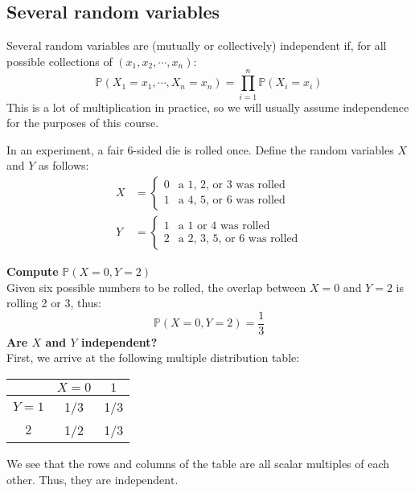 \documentclass[titlepage, 12pt, leqno]{article}
\begin{document}
\subsection{Several random variables}
Several random variables are (mutually or collectively) independent if, for all 
possible collections of $(x_1,x_2, \cdots ,x_n)$:
\[
\mathbb{P}(X_1 = x_1, \cdots , X_n = x_n) = \prod_{i=1}^{n}\mathbb{P}(X_i=x_i)
\]
This is a lot of multiplication in practice, so we will usually assume 
independence for the purposes of this course.
\begin{ex}
    In an experiment, a fair 6-sided die is rolled once. Define the random 
    variables $X$ and $Y$ as follows:
   \begin{align*}
       X &= 
        \begin{cases}
            0 & \text{a 1, 2, or 3 was rolled} \\
            1 & \text{a 4, 5, or 6 was rolled}
        \end{cases} \\
       Y &=
        \begin{cases}
            1 & \text{a 1 or 4 was rolled} \\
            2 & \text{a 2, 3, 5, or 6 was rolled}
        \end{cases}
   \end{align*}
   
    \textbf{Compute} $\mathbb{P}(X=0, Y=2)$\\[.1in]
    Given six possible numbers to be rolled, the overlap between $X=0$ and $Y=2$
    is rolling 2 or 3, thus:
    \[
    \boxed{\mathbb{P}(X=0, Y=2) = \frac{1}{3}} 
    \]
    \textbf{Are $X$ and $Y$ independent?} \\
    First, we arrive at the following multiple distribution table:
    \vspace{10px}
    \begin{center}
    \begin{tabular}{c|c c}
        & $X=0$ & $1$\\
        \hline
        $Y=1$ & 1/3 & 1/3 \\
        $2$ & 1/2 & 1/3
    \end{tabular}
    \end{center}
    \vspace{10px}
    
    We see that the rows and columns of the table are all scalar multiples of
    each other. Thus, they are $\boxed{ \text{independent}}$.
\end{ex}
\end{document}
